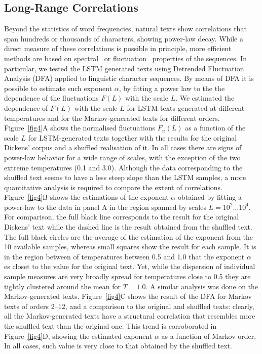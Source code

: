 \documentclass[journal]{IEEEtran}
\begin{document}
\subsection{Long-Range Correlations}
Beyond the statistics of word frequencies, natural texts show correlations that
span hundreds or thousands of characters, showing power-law decay. While a
direct measure of these correlations is possible in principle, more efficient
methods are based on spectral~\cite{Voss1975} or
fluctuation~\cite{Peng1992,Buldyrev1995} properties of the sequences. In
particular, we tested the LSTM generated texts
using Detrended Fluctuation Analysis (DFA) \cite{Peng1992,Buldyrev1995} applied
to linguistic character sequences.
By means of DFA it is possible to estimate such exponent
$\alpha$, by fitting a power law to the the dependence of the
fluctuations $F(L)$  with the scale $L$.  We estimated the dependence of $F(L)$
with the scale $L$ for LSTM texts generated at different temperatures
and for the Markov-generated texts for different orders.  Figure~\ref{fig4}A
shows the
normalised fluctuations $F_n(L)$ as a function of the scale $L$ for
LSTM-generated texts
together with the results for the original Dickens' corpus and a shuffled
realisation of it.
In all cases there are signs of power-law behavior for a wide range of scales,
with the exception
of the two extreme temperatures (0.1 and 3.0). Although the data
corresponding to the
shuffled text seems to have a less steep slope than the LSTM samples, a more
quantitative analysis is required
to compare the extent of correlations. Figure~\ref{fig4}B shows the
estimations of the exponent $\alpha$
obtained by fitting a power-law to the data in panel A in the region spanned by
scales $L=10^2\ldots 10^4$. For comparison,
the full black line corresponds to the result for the original
Dickens' text while the dashed line is the result obtained
from the shuffled text. The full black circles are the average of the
estimation of the exponent from the 10 available samples,
whereas small squares show the result for each sample. It is in the
region between of temperatures between
0.5 and 1.0 that the exponent $\alpha$ es closet to the value for the original
text. Yet, while the dispersion of individual
sample measures are very broadly spread for temperatures close to 0.5 they are
tightly clustered around
the mean for $T=1.0$. A similar analysis was done on the Markov-generated
texts. Figure~\ref{fig4}C shows the result of the DFA for Markov texts
of orders 2--12, and a comparison to the original and shuffled texts:
clearly, all the Markov-generated texts have a
structural correlation that resembles more the shuffled text than the
original one. This trend is corroborated in Figure~\ref{fig4}D, showing
the estimated
exponent $\alpha$ as a function of Markov order. In all cases,
such value is very close to that obtained by the shuffled
text.
\end{document}

